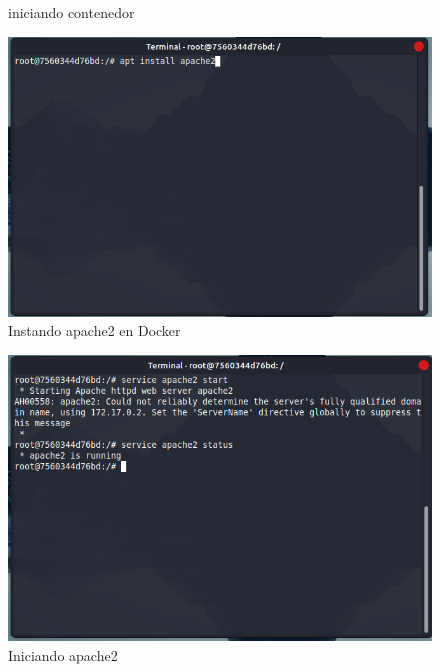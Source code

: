 \documentclass{article}
\begin{document}
\begin{itemize}
\begin{figure}[H]
  \caption{iniciando contenedor}
  \label{fig:imagen3}
\end{figure}
        \begin{figure}[H]
  \centering
  \includegraphics[width=1\textwidth]{img/Pictures/installApache2.png}
  \caption{Instando apache2 en Docker}
  \label{fig:imagen4}
\end{figure}
        \begin{figure}[H]
  \centering
  \includegraphics[width=1\textwidth]{img/Pictures/apache2Start.png}
  \caption{Iniciando apache2}
  \end{figure}


\end{itemize}
\end{document}
